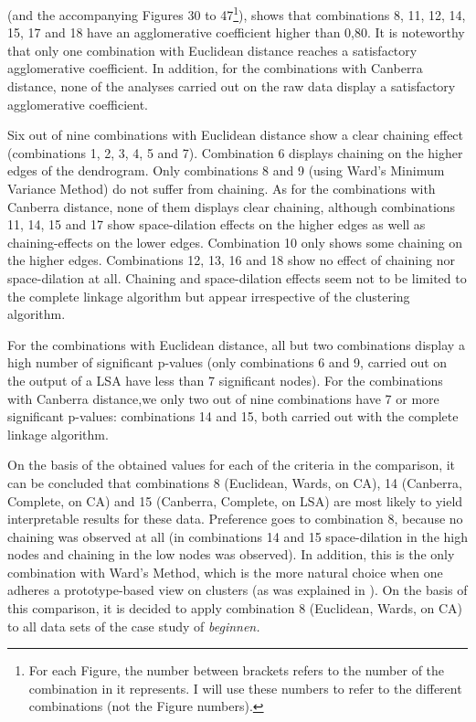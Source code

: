  (and the accompanying Figures 30 to 47\footnote{For each Figure, the number between brackets refers to the number of the combination in  it represents. I will use these numbers to refer to the different combinations (not the Figure numbers).}), shows that combinations 8, 11, 12, 14, 15, 17 and 18 have an agglomerative coefficient higher than 0,80. It is noteworthy that only one combination with Euclidean distance reaches a satisfactory agglomerative coefficient. In addition, for the combinations with Canberra distance, none of the analyses carried out on the raw data display a satisfactory agglomerative coefficient.



Six out of nine combinations with Euclidean distance show a clear chaining effect (combinations 1, 2, 3, 4, 5 and 7). Combination 6 displays chaining on the higher edges of the dendrogram. Only combinations 8 and 9 (using Ward’s Minimum Variance Method) do not suffer from chaining. As for the combinations with Canberra distance, none of them displays clear chaining, although combinations 11, 14, 15 and 17 show space-dilation effects on the higher edges as well as chaining-effects on the lower edges. Combination 10 only shows some chaining on the higher edges. Combinations 12, 13, 16 and 18 show no effect of chaining nor space-dilation at all. Chaining and space-dilation effects seem not to be limited to the complete linkage algorithm but appear irrespective of the clustering algorithm.



For the combinations with Euclidean distance, all but two combinations display a high number of significant p-values (only combinations 6 and 9, carried out on the output of a LSA have less than 7 significant nodes). For the combinations with Canberra distance,we only two out of nine combinations have 7 or more significant p-values: combinations 14 and 15, both carried out with the complete linkage algorithm.



On the basis of the obtained values for each of the criteria in the comparison, it can be concluded that combinations 8 (Euclidean, Wards, on CA), 14 (Canberra, Complete, on CA) and 15 (Canberra, Complete, on LSA) are most likely to yield interpretable results for these data. Preference goes to combination 8, because no chaining was observed at all (in combinations 14 and 15 space-dilation in the high nodes and chaining in the low nodes was observed). In addition, this is the only combination with Ward’s Method, which is the more natural choice when one adheres a prototype-based view on clusters (as was explained in ). On the basis of this comparison, it is decided to apply combination 8 (Euclidean, Wards, on CA) to all data sets of the case study of \textit{beginnen.}



